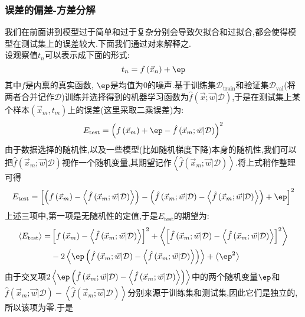 \documentclass{ctexart}
\begin{document}
\subsubsection{误差的偏差-方差分解}
我们在前面讲到模型过于简单和过于复杂分别会导致欠拟合和过拟合,都会使得模型在测试集上的误差较大.下面我们通过对来解释之.\\
\indent 设观察值$t_n$可以表示成下面的形式:
\[t_n=f\left(\vec{x}_n\right)+\ep\]
其中$f$是内禀的真实函数, $\ep$是均值为$0$的噪声.基于训练集$\mathcal{D}_{\text{train}}$和验证集$\mathcal{D}_{\text{val}}$(将两者合并记作$\mathcal{D}$)训练并选择得到的机器学习函数为$\hat{f}\left(\vec{x};\vec{w}\vert\mathcal{D}\right)$,于是在测试集上某个样本$\left(\vec{x}_m,t_m\right)$上的误差(这里采取二乘误差)为:
\[E_{\text{test}}=\left(f\left(\vec{x}_m\right)+\ep-\hat{f}\left(\vec{x}_m;\vec{w}\vert\mathcal{D}\right)\right)^2\]
由于数据选择的随机性,以及一些模型(比如随机梯度下降)本身的随机性,我们可以把$\hat{f}\left(\vec{x}_m;\vec{w}\vert\mathcal{D}\right)$视作一个随机变量,其期望记作$\left\langle\hat{f}\left(\vec{x}_m;\vec{w}\vert\mathcal{D}\right)\right\rangle$.将上式稍作整理可得
\[E_{\text{test}}=\left[\left(f\left(\vec{x}_m\right)-\left\langle\hat{f}\left(\vec{x}_m;\vec{w}\vert\mathcal{D}\right)\right\rangle\right)-\left(\hat{f}\left(\vec{x}_m;\vec{w}\vert\mathcal{D}\right)-\left\langle\hat{f}\left(\vec{x}_m;\vec{w}\vert\mathcal{D}\right)\right\rangle\right)+\ep\right]^2\]
上述三项中,第一项是无随机性的定值,于是$E_{\text{test}}$的期望为:
\[\begin{aligned}
    \left\langle E_{\text{test}}\right\rangle
    =&\left[f\left(\vec{x}_m\right)-\left\langle\hat{f}\left(\vec{x}_m;\vec{w}\vert\mathcal{D}\right)\right\rangle\right]^2+\left\langle\left[\hat{f}\left(\vec{x}_m;\vec{w}\vert\mathcal{D}\right)-\left\langle\hat{f}\left(\vec{x}_m;\vec{w}\vert\mathcal{D}\right)\right\rangle\right]^2\right\rangle\\
    &-2\left\langle\ep\left(\hat{f}\left(\vec{x}_m;\vec{w}\vert\mathcal{D}\right)-\left\langle\hat{f}\left(\vec{x}_m;\vec{w}\vert\mathcal{D}\right)\right\rangle\right)\right\rangle+\left\langle\ep^2\right\rangle
\end{aligned}\]
由于交叉项$2\left\langle\ep\left(\hat{f}\left(\vec{x}_m;\vec{w}\vert\mathcal{D}\right)-\left\langle\hat{f}\left(\vec{x}_m;\vec{w}\vert\mathcal{D}\right)\right\rangle\right)\right\rangle$中的两个随机变量$\ep$和$\hat{f}\left(\vec{x}_m;\vec{w}\vert\mathcal{D}\right)-\left\langle\hat{f}\left(\vec{x}_m;\vec{w}\vert\mathcal{D}\right)\right\rangle$分别来源于训练集和测试集,因此它们是独立的,所以该项为零.于是
\end{document}
